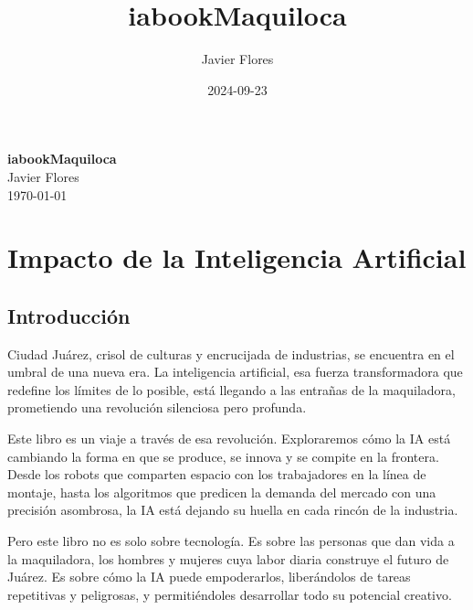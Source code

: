 \documentclass[
  10pt,
  letterpaper,
]{book}
\title{iabookMaquiloca}
\author{Javier Flores}
\date{2024-09-23}
\renewcommand*\contentsname{Table of contents}
\newcommand\contentsname{Table of contents}
\begin{document}
\frontmatter
\maketitle

\begin{titlepage}
\centering
\vspace*{5cm} %
{\Huge \textbf{iabookMaquiloca}}\\[1cm]
{\Large Javier Flores}\\[2cm]
{\large \today}\\[5cm]
\end{titlepage}

\renewcommand*\contentsname{Table of contents}
{
\hypersetup{linkcolor=}
\setcounter{tocdepth}{1}
\tableofcontents
}

\mainmatter
{}

\chapter*{Impacto de la Inteligencia
Artificial}\label{impacto-de-la-inteligencia-artificial}


\section*{Introducción}\label{introducciuxf3n}


Ciudad Juárez, crisol de culturas y encrucijada de industrias, se
encuentra en el umbral de una nueva era. La inteligencia artificial, esa
fuerza transformadora que redefine los límites de lo posible, está
llegando a las entrañas de la maquiladora, prometiendo una revolución
silenciosa pero profunda.

Este libro es un viaje a través de esa revolución. Exploraremos cómo la
IA está cambiando la forma en que se produce, se innova y se compite en
la frontera. Desde los robots que comparten espacio con los trabajadores
en la línea de montaje, hasta los algoritmos que predicen la demanda del
mercado con una precisión asombrosa, la IA está dejando su huella en
cada rincón de la industria.

Pero este libro no es solo sobre tecnología. Es sobre las personas que
dan vida a la maquiladora, los hombres y mujeres cuya labor diaria
construye el futuro de Juárez. Es sobre cómo la IA puede empoderarlos,
liberándolos de tareas repetitivas y peligrosas, y permitiéndoles
desarrollar todo su potencial creativo.
\end{document}
